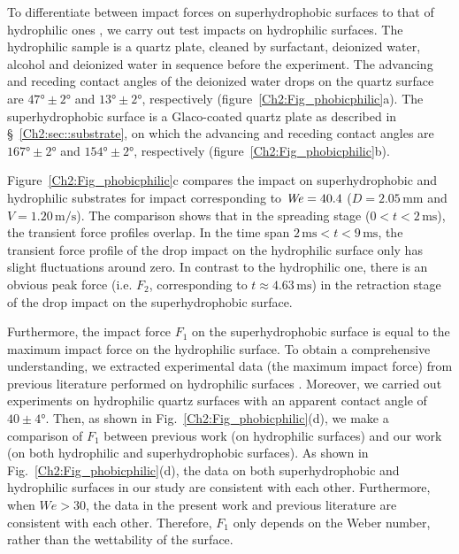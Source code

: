 \begin{subappendices}
	To differentiate between impact forces on superhydrophobic surfaces to that of hydrophilic ones \cite{li2014, soto2014, philippi2016, zhang2017, Gordillo2018, mitchell2019, zhang2019}, we carry out test impacts on hydrophilic surfaces. The hydrophilic sample is a quartz plate, cleaned by surfactant, deionized water, alcohol and deionized water in sequence before the experiment. The advancing and receding contact angles of the deionized water drops on the quartz surface are $47\si{\degree} \pm 2\si{\degree}$ and $13\si{\degree} \pm 2\si{\degree}$, respectively (figure~\ref{Ch2:Fig_phobicphilic}a). The superhydrophobic surface is a Glaco-coated quartz plate \cite{li2017, gauthier2015} as described in \S~\ref{Ch2:sec::substrate}, on which the advancing and receding contact angles are $167\si{\degree} \pm 2\si{\degree}$ and $154\si{\degree} \pm 2\si{\degree}$, respectively (figure~\ref{Ch2:Fig_phobicphilic}b). 
	
	Figure~\ref{Ch2:Fig_phobicphilic}c compares the impact on superhydrophobic and hydrophilic substrates for impact corresponding to $\mathit{We} = 40.4$ ($D = 2.05\,\si{\milli\meter}$ and $V = 1.20\,\si{\meter}/\si{\second}$). The comparison shows that in the spreading stage ($0 < t < 2\,\si{\milli\second}$), the transient force profiles overlap. In the time span $2\,\si{\milli\second} < t < 9\,\si{\milli\second}$, the transient force profile of the drop impact on the hydrophilic surface only has slight fluctuations around zero. In contrast to the hydrophilic one, there is an obvious peak force (i.e. $F_2$, corresponding to $t \approx 4.63\,\si{\milli\second}$) in the retraction stage of the drop impact on the superhydrophobic surface.
	
	Furthermore, the impact force $F_1$ on the superhydrophobic surface is equal to the maximum impact force on the hydrophilic surface. To obtain a comprehensive understanding, we extracted experimental data (the maximum impact force) from previous literature performed on hydrophilic surfaces \cite{soto2014, mitchell2016experimental, zhang2017, Gordillo2018, mitchell2019, zhang2019}. Moreover, we carried out experiments on hydrophilic quartz surfaces with an apparent contact angle of $40 \pm 4\si{\degree}$. Then, as shown in Fig.~\ref{Ch2:Fig_phobicphilic}(d), we make a comparison of $F_1$ between previous work (on hydrophilic surfaces) and our work (on both hydrophilic and superhydrophobic surfaces). As shown in Fig.~\ref{Ch2:Fig_phobicphilic}(d), the data on both superhydrophobic and hydrophilic surfaces in our study are consistent with each other. Furthermore, when $We > 30$, the data in the present work and previous literature are consistent with each other. Therefore, $F_1$ only depends on the Weber number, rather than the wettability of the surface. 
	

\end{subappendices}
